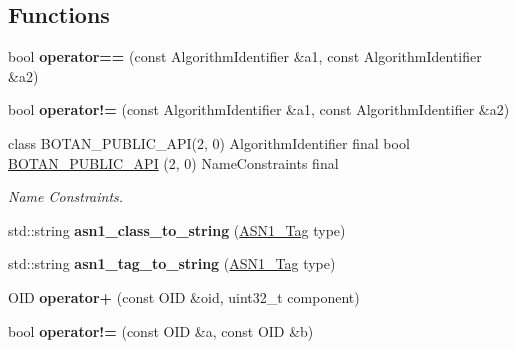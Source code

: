 \subsection*{Functions}
\begin{DoxyCompactItemize}
\item 
\mbox{\label{namespace_botan_a92a080687352bfae710755e6d982f619}} 
bool {\bfseries operator==} (const Algorithm\+Identifier \&a1, const Algorithm\+Identifier \&a2)
\item 
\mbox{\label{namespace_botan_a6ef372a2f77f37fe6f40b80fc5988e7c}} 
bool {\bfseries operator!=} (const Algorithm\+Identifier \&a1, const Algorithm\+Identifier \&a2)
\item 
class B\+O\+T\+A\+N\+\_\+\+P\+U\+B\+L\+I\+C\+\_\+\+A\+PI(2, 0) Algorithm\+Identifier final bool \mbox{\hyperlink{namespace_botan_a6b9388030d872e586a4655b776ac9501}{B\+O\+T\+A\+N\+\_\+\+P\+U\+B\+L\+I\+C\+\_\+\+A\+PI}} (2, 0) Name\+Constraints final
\begin{DoxyCompactList}\small\item\em Name Constraints. \end{DoxyCompactList}\item 
\mbox{\label{namespace_botan_ae3fd3b8984ac014a97d4c7e88547f35c}} 
std\+::string {\bfseries asn1\+\_\+class\+\_\+to\+\_\+string} (\mbox{\hyperlink{namespace_botan_acc1ab433420bdddbcfe52dbbd94e8576}{A\+S\+N1\+\_\+\+Tag}} type)
\item 
\mbox{\label{namespace_botan_af5d65b1f703d9c29527586b69bac0021}} 
std\+::string {\bfseries asn1\+\_\+tag\+\_\+to\+\_\+string} (\mbox{\hyperlink{namespace_botan_acc1ab433420bdddbcfe52dbbd94e8576}{A\+S\+N1\+\_\+\+Tag}} type)
\item 
\mbox{\label{namespace_botan_a25386a9e68f8a7fa3cfe2d576a14cce1}} 
O\+ID {\bfseries operator+} (const O\+ID \&oid, uint32\+\_\+t component)
\item 
\mbox{\label{namespace_botan_a628ad693dc802e2920e3a7efdea5d7c8}} 
bool {\bfseries operator!=} (const O\+ID \&a, const O\+ID \&b)
\item 
\mbox{\label{namespace_botan_a39bb1018a3447984046ed00e1450d81c}} 

\end{DoxyCompactItemize}
